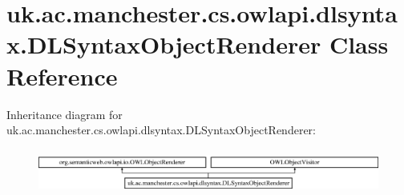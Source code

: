 \hypertarget{classuk_1_1ac_1_1manchester_1_1cs_1_1owlapi_1_1dlsyntax_1_1_d_l_syntax_object_renderer}{\section{uk.\-ac.\-manchester.\-cs.\-owlapi.\-dlsyntax.\-D\-L\-Syntax\-Object\-Renderer Class Reference}
\label{classuk_1_1ac_1_1manchester_1_1cs_1_1owlapi_1_1dlsyntax_1_1_d_l_syntax_object_renderer}
}
Inheritance diagram for uk.\-ac.\-manchester.\-cs.\-owlapi.\-dlsyntax.\-D\-L\-Syntax\-Object\-Renderer\-:\begin{figure}[H]
\begin{center}
\leavevmode
\includegraphics[height=1.493333cm]{classuk_1_1ac_1_1manchester_1_1cs_1_1owlapi_1_1dlsyntax_1_1_d_l_syntax_object_renderer}
\end{center}
\end{figure}
